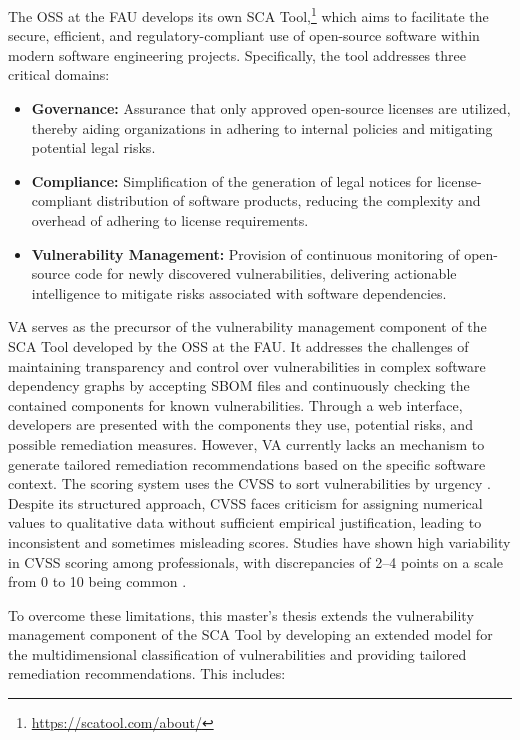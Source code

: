 The \ac{OSS} at the \ac{FAU} develops its own \ac{SCA} Tool,\footnote{\url{https://scatool.com/about/}} which aims to facilitate the secure, efficient, and regulatory-compliant use of open-source software within modern software engineering projects. Specifically, the tool addresses three critical domains:

\begin{itemize}
    \item \textbf{Governance:} Assurance that only approved open-source licenses are utilized, thereby aiding organizations in adhering to internal policies and mitigating potential legal risks.
    \item \textbf{Compliance:} Simplification of the generation of legal notices for license-compliant distribution of software products, reducing the complexity and overhead of adhering to license requirements.
    \item \textbf{Vulnerability Management:} Provision of continuous monitoring of open-source code for newly discovered vulnerabilities, delivering actionable intelligence to mitigate risks associated with software dependencies.
\end{itemize}

\ac{VA} serves as the precursor of the vulnerability management component of the \ac{SCA} Tool developed by the \ac{OSS} at the \ac{FAU}. It addresses the challenges of maintaining transparency and control over vulnerabilities in complex software dependency graphs by accepting \ac{SBOM} files and continuously checking the contained components for known vulnerabilities. Through a web interface, developers are presented with the components they use, potential risks, and possible remediation measures. However, \ac{VA} currently lacks an mechanism to generate tailored remediation recommendations based on the specific software context. The scoring system uses the \ac{CVSS} to sort vulnerabilities by urgency \autocite{nehrke_webdienst_2023}. Despite its structured approach, \ac{CVSS} faces criticism for assigning numerical values to qualitative data without sufficient empirical justification, leading to inconsistent and sometimes misleading scores. Studies have shown high variability in \ac{CVSS} scoring among professionals, with discrepancies of 2--4 points on a scale from 0 to 10 being common \autocite{spring_time_2021}.

To overcome these limitations, this master's thesis extends the vulnerability management component of the \ac{SCA} Tool by developing an extended model for the multidimensional classification of vulnerabilities and providing tailored remediation recommendations. This includes:

